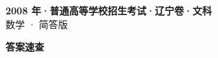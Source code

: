 \documentclass[zihao=-4, a4paper]{ctexart}
\begin{document}
\begin{center}
  {\Large\bfseries 2008 年·普通高等学校招生考试·辽宁卷·文科}\\[4pt]
  {\large 数学 · 简答版}
\end{center}
\medskip
{}

\clearpage
{}
\begin{center}{\Large\bfseries 答案速查}\end{center}
\medskip

\end{document}
